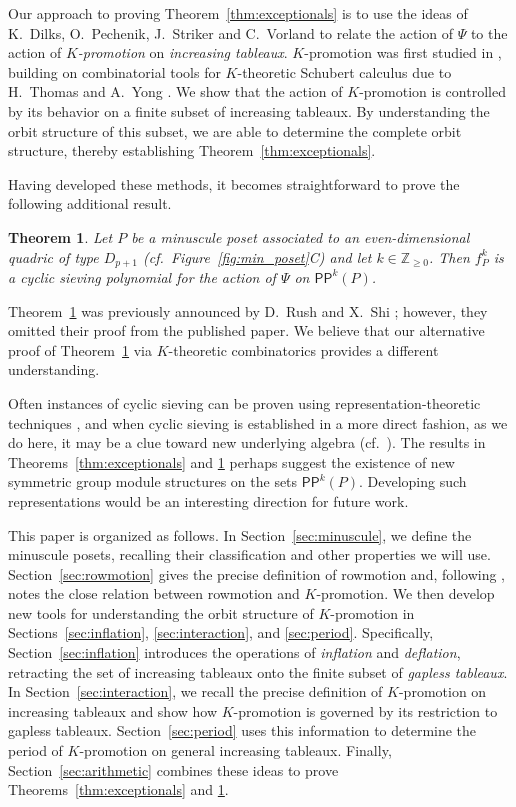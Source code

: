 \documentclass[12pt]{amsart}
\newtheorem{theorem}{Theorem}[section]
\theoremstyle{definition}
\theoremstyle{remark}
\numberwithin{equation}{section}
\newcommand{\pp}{\ensuremath{\mathsf{PP}}}
\begin{document}
Our approach to proving Theorem~\ref{thm:exceptionals} is to use the ideas of K.~Dilks, O.~Pechenik, J.~Striker and C.~Vorland \cite{DPS, Dilks.Striker.Vorland} to relate the action of $\Psi$ to the action of \emph{$K$-promotion} on \emph{increasing tableaux}. $K$-promotion was first studied in \cite{Pechenik}, building on combinatorial tools for $K$-theoretic Schubert calculus due to H.~Thomas and A.~Yong \cite{Thomas.Yong:K}. We show that the action of $K$-promotion is controlled by its behavior on a finite subset of increasing tableaux. By understanding the orbit structure of this subset, we are able to determine the complete orbit structure, thereby establishing Theorem~\ref{thm:exceptionals}.

Having developed these methods, it becomes straightforward to prove the following additional result.
\begin{theorem}\label{thm:propeller}
Let $P$ be a minuscule poset associated to an even-dimensional quadric of type $D_{p+1}$ (cf.~Figure~\ref{fig:min_poset}C) and let $k \in \mathbb{Z}_{\geq 0}$. Then $f_P^k$ is a cyclic sieving polynomial for the action of $\Psi$ on $\pp^k(P)$.
\end{theorem}
Theorem~\ref{thm:propeller} was previously announced by D.~Rush and X.~Shi \cite[Theorem~10.1]{Rush.Shi}; however, they omitted their proof \cite[]{Rush.Shi:report} from the published paper. We believe that our alternative proof of Theorem~\ref{thm:propeller} via $K$-theoretic combinatorics provides a different understanding.

Often instances of cyclic sieving can be proven using representation-theoretic techniques \cite{Reiner.Stanton.White, Rhoades:thesis}, and when cyclic sieving is established in a more direct fashion, as we do here, it may be a clue toward new underlying algebra (cf.\ \cite{Rhoades:skein}). The results in Theorems~\ref{thm:exceptionals} and \ref{thm:propeller} perhaps suggest the existence of new symmetric group module structures on the sets $\pp^k(P)$. Developing such representations would be an interesting direction for future work.

This paper is organized as follows. In Section~\ref{sec:minuscule}, we define the minuscule posets, recalling their classification and other properties we will use. Section~\ref{sec:rowmotion} gives the precise definition of rowmotion and, following \cite{DPS,Dilks.Striker.Vorland}, notes the close relation between rowmotion and $K$-promotion. We then develop new tools for understanding the orbit structure of $K$-promotion in Sections~\ref{sec:inflation}, \ref{sec:interaction}, and \ref{sec:period}. Specifically, Section~\ref{sec:inflation} introduces the operations of \emph{inflation} and \emph{deflation}, retracting the set of increasing tableaux onto the finite subset of \emph{gapless tableaux}. 
In Section~\ref{sec:interaction}, we recall the precise definition of $K$-promotion on increasing tableaux and show how $K$-promotion is governed by its restriction to gapless tableaux. Section~\ref{sec:period} uses this information to determine the period of $K$-promotion on general increasing tableaux.
Finally, Section~\ref{sec:arithmetic} combines these ideas to prove Theorems~\ref{thm:exceptionals} and \ref{thm:propeller}.
\end{document}
